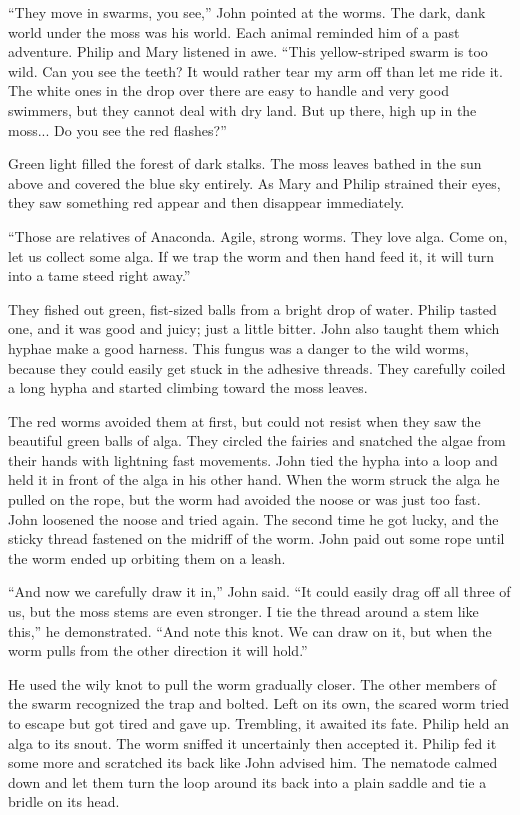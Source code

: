 \documentclass[10pt, draft]{memoir}
\begin{document}
``They move in swarms, you see,'' John pointed at the worms. The dark, dank world under the moss was his world. Each animal reminded him of a past adventure. Philip and Mary listened in awe. ``This yellow-striped swarm is too wild. Can you see the teeth? It would rather tear my arm off than let me ride it. The white ones in the drop over there are easy to handle and very good swimmers, but they cannot deal with dry land. But up there, high up in the moss... Do you see the red flashes?”

Green light filled the forest of dark stalks. The moss leaves bathed in the sun above and covered the blue sky entirely. As Mary and Philip strained their eyes, they saw something red appear and then disappear immediately.

``Those are relatives of Anaconda. Agile, strong worms. They love alga. Come on, let us collect some alga. If we trap the worm and then hand feed it, it will turn into a tame steed right away.”

They fished out green, fist-sized balls from a bright drop of water. Philip tasted one, and it was good and juicy; just a little bitter. John also taught them which hyphae make a good harness. This fungus was a danger to the wild worms, because they could easily get stuck in the adhesive threads. They carefully coiled a long hypha and started climbing toward the moss leaves.

The red worms avoided them at first, but could not resist when they saw the beautiful green balls of alga. They circled the fairies and snatched the algae from their hands with lightning fast movements. John tied the hypha into a loop and held it in front of the alga in his other hand. When the worm struck the alga he pulled on the rope, but the worm had avoided the noose or was just too fast. John loosened the noose and tried again. The second time he got lucky, and the sticky thread fastened on the midriff of the worm. John paid out some rope until the worm ended up orbiting them on a leash.

``And now we carefully draw it in,'' John said. ``It could easily drag off all three of us, but the moss stems are even stronger. I tie the thread around a stem like this,'' he demonstrated. ``And note this knot. We can draw on it, but when the worm pulls from the other direction it will hold.''

He used the wily knot to pull the worm gradually closer. The other members of the swarm recognized the trap and bolted. Left on its own, the scared worm tried to escape but got tired and gave up. Trembling, it awaited its fate. Philip held an alga to its snout. The worm sniffed it uncertainly then accepted it. Philip fed it some more and scratched its back like John advised him. The nematode calmed down and let them turn the loop around its back into a plain saddle and tie a bridle on its head.
\end{document}
